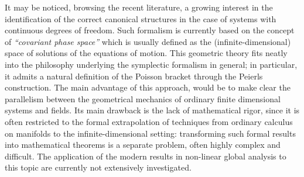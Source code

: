 \documentclass[Main]{subfiles}
\begin{document}
	It  may be noticed, browsing the recent literature, a growing interest in the identification of the correct canonical structures in the case of systems with continuous degrees of freedom.
	Such formalism is currently based on the concept of \emph{“covariant phase space”} which is usually defined as the (infinite-dimensional) space of solutions of the equations of motion.
				This geometric theory fits neatly into the philosophy underlying the symplectic formalism in general; in particular, it admits a natural definition of the Poisson bracket through the Peierls construction.
		The main advantage of this approach, would be to make clear the parallelism between the geometrical mechanics of ordinary finite dimensional systems and fields.
		Its main drawback is the lack of mathematical rigor, since it is often restricted to the formal extrapolation of techniques from ordinary calculus on manifolds to the infinite-dimensional setting: transforming such formal results into mathematical theorems is a separate problem, often highly complex and difficult.
		The application of the modern results in non-linear global analysis to this topic are currently not extensively investigated.
	
\end{document}
